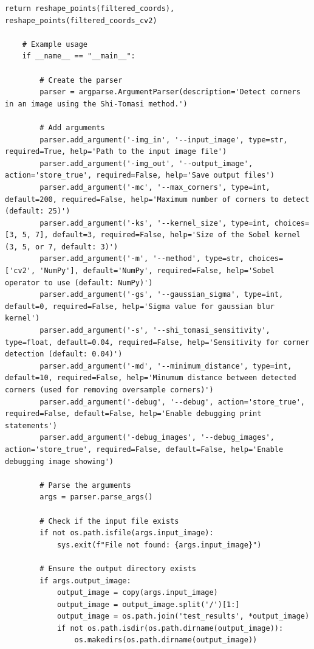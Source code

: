 \documentclass[11pt, conference, letterpaper]{IEEEtran}
\begin{document}
\begin{lstlisting}[style=python, caption={\texttt{shi\_tomasi\_corners.py}}, label={lst:stc}]
        return reshape_points(filtered_coords), reshape_points(filtered_coords_cv2)
    
    # Example usage
    if __name__ == "__main__":
    
        # Create the parser
        parser = argparse.ArgumentParser(description='Detect corners in an image using the Shi-Tomasi method.')
    
        # Add arguments
        parser.add_argument('-img_in', '--input_image', type=str, required=True, help='Path to the input image file')
        parser.add_argument('-img_out', '--output_image', action='store_true', required=False, help='Save output files')
        parser.add_argument('-mc', '--max_corners', type=int, default=200, required=False, help='Maximum number of corners to detect (default: 25)')
        parser.add_argument('-ks', '--kernel_size', type=int, choices=[3, 5, 7], default=3, required=False, help='Size of the Sobel kernel (3, 5, or 7, default: 3)')
        parser.add_argument('-m', '--method', type=str, choices=['cv2', 'NumPy'], default='NumPy', required=False, help='Sobel operator to use (default: NumPy)')
        parser.add_argument('-gs', '--gaussian_sigma', type=int, default=0, required=False, help='Sigma value for gaussian blur kernel')
        parser.add_argument('-s', '--shi_tomasi_sensitivity', type=float, default=0.04, required=False, help='Sensitivity for corner detection (default: 0.04)')
        parser.add_argument('-md', '--minimum_distance', type=int, default=10, required=False, help='Minumum distance between detected corners (used for removing oversample corners)')
        parser.add_argument('-debug', '--debug', action='store_true', required=False, default=False, help='Enable debugging print statements')
        parser.add_argument('-debug_images', '--debug_images', action='store_true', required=False, default=False, help='Enable debugging image showing')
    
        # Parse the arguments
        args = parser.parse_args()
    
        # Check if the input file exists
        if not os.path.isfile(args.input_image):
            sys.exit(f"File not found: {args.input_image}")
        
        # Ensure the output directory exists
        if args.output_image:
            output_image = copy(args.input_image)
            output_image = output_image.split('/')[1:]
            output_image = os.path.join('test_results', *output_image)
            if not os.path.isdir(os.path.dirname(output_image)):
                os.makedirs(os.path.dirname(output_image))
    

\end{lstlisting}
\end{document}
